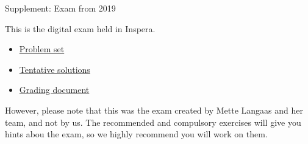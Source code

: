 \documentclass[10pt,ignorenonframetext,]{beamer}
\providecommand{\tightlist}{%
  \setlength{\itemsep}{0pt}\setlength{\parskip}{0pt}}
\begin{document}
\begin{frame}{Supplement: Exam from 2019}

This is the digital exam held in Inspera.

\begin{itemize}
\tightlist
\item
  \href{https://www.math.ntnu.no/emner/TMA4268/Exam/V2019e.pdf}{Problem
  set}
\item
  \href{https://www.math.ntnu.no/emner/TMA4268/Exam/e2019sol.html}{Tentative
  solutions}
\item
  \href{https://www.math.ntnu.no/emner/TMA4268/Exam/gradingdocumentV2019.pdf}{Grading
  document}
\end{itemize}

However, please note that this was the exam created by Mette Langaas and
her team, and not by us. The recommended and compulsory exercises will
give you hints abou the exam, so we highly recommend you will work on
them.

\end{frame}
\end{document}
